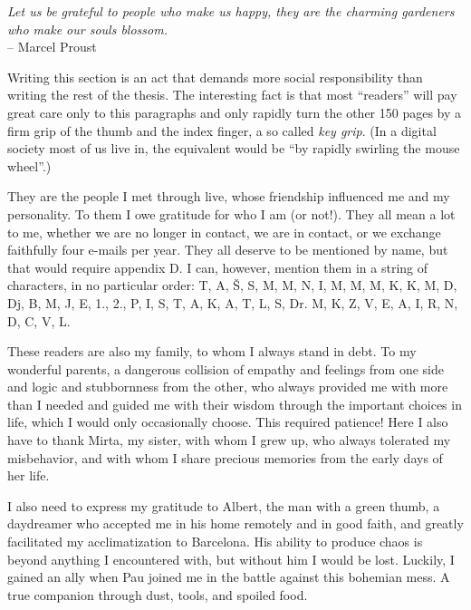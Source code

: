 \cleardoublepage


\begin{acknowledgements}

\narrowlinespacing
\begin{myquote}
\begin{flushright}
\textit{Let us be grateful to people who make us happy, they are the charming gardeners who make our souls blossom.} \\-- Marcel Proust
\end{flushright}
\end{myquote}
\normallinespacing

Writing this section is an act that demands more social responsibility than writing the rest of the thesis. The interesting fact is that most “readers” will pay great care only to this paragraphs and only rapidly turn the other 150 pages by a firm grip of the thumb and the index finger, a so called \emph{key grip}. (In a digital society most of us live in, the equivalent would be “by rapidly swirling the mouse wheel”.)

They are the people I met through live, whose friendship influenced me and my personality. To them I owe gratitude for who I am (or not!). They all mean a lot to me, whether we are no longer in contact, we are in contact, or we exchange faithfully four e-mails per year. They all deserve to be mentioned by name, but that would require appendix D. I can, however, mention them in a string of characters, in no particular order: T, A, Š, S, M, M, N, I, M, M, M, K, K, M, D, Dj, B, M, J, E, 1., 2., P, I, S, T, A, K, A, T, L, S, Dr. M, K, Z, V, E, A, I, R, N, D, C, V, L.

These readers are also my family, to whom I always stand in debt. To my wonderful parents, a dangerous collision of empathy and feelings from one side and logic and stubbornness from the other, who always provided me with more than I needed and guided me with their wisdom through the important choices in life, which I would only occasionally choose. This required patience! Here I also have to thank Mirta, my sister, with whom I grew up, who always tolerated my misbehavior, and with whom I share precious memories from the early days of her life. 

I also need to express my gratitude to Albert, the man with a green thumb, a daydreamer who accepted me in his home remotely and in good faith, and greatly facilitated my acclimatization to Barcelona. His ability to produce chaos is beyond anything I encountered with, but without him I would be lost. Luckily, I gained an ally when Pau joined me in the battle against this bohemian mess. A true companion through dust, tools, and spoiled food.


\end{acknowledgements}
